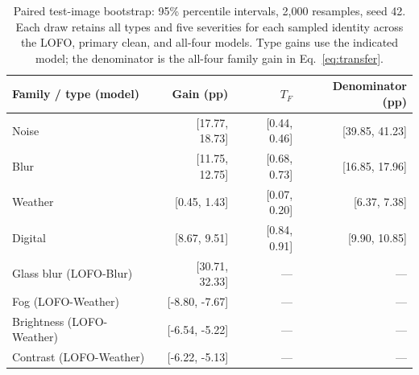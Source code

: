\begin{table}[!htbp]
\caption{Paired test-image bootstrap: 95\% percentile intervals, 2,000 resamples, seed 42. Each draw retains all types and five severities for each sampled identity across the LOFO, primary clean, and all-four models. Type gains use the indicated model; the denominator is the all-four family gain in Eq.~\ref{eq:transfer}.}
\label{tab:bootstrap}
\centering
\setlength{\tabcolsep}{5pt}
\begin{tabular}{lrrr}
\toprule
Family / type (model) & Gain (pp) & $T_F$ & Denominator (pp) \\
\midrule
Noise & [17.77, 18.73] & [0.44, 0.46] & [39.85, 41.23] \\
Blur & [11.75, 12.75] & [0.68, 0.73] & [16.85, 17.96] \\
Weather & [0.45, 1.43] & [0.07, 0.20] & [6.37, 7.38] \\
Digital & [8.67, 9.51] & [0.84, 0.91] & [9.90, 10.85] \\
\midrule
Glass blur (LOFO-Blur) & [30.71, 32.33] & --- & --- \\
Fog (LOFO-Weather) & [-8.80, -7.67] & --- & --- \\
Brightness (LOFO-Weather) & [-6.54, -5.22] & --- & --- \\
Contrast (LOFO-Weather) & [-6.22, -5.13] & --- & --- \\
\bottomrule
\end{tabular}
\end{table}
